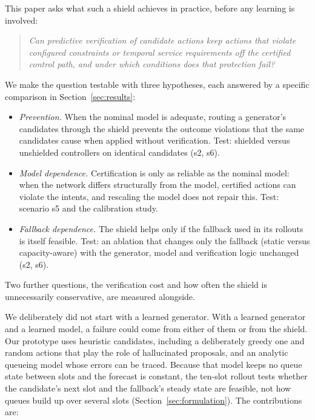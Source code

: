 \documentclass[conference]{IEEEtran}
\begin{document}
This paper asks what such a shield achieves in practice, before any learning is
involved:

\begin{quote}
\emph{Can predictive verification of candidate actions keep actions that violate
configured constraints or temporal service requirements off the certified control
path, and under which conditions does that protection fail?}
\end{quote}

\noindent We make the question testable with three hypotheses, each answered by a
specific comparison in Section~\ref{sec:results}:

\begin{itemize}
\item[\textbf{H1}] \emph{Prevention.} When the nominal model is adequate, routing
a generator's candidates through the shield prevents the outcome violations that
the same candidates cause when applied without verification. Test: shielded versus
unshielded controllers on identical candidates (s2, s6).
\item[\textbf{H2}] \emph{Model dependence.} Certification is only as reliable as the
nominal model: when the network differs structurally from the model, certified
actions can violate the intents, and rescaling the model does not repair this.
Test: scenario s5 and the calibration study.
\item[\textbf{H3}] \emph{Fallback dependence.} The shield helps only if the
fallback used in its rollouts is itself feasible. Test: an ablation that changes only
the fallback (static versus capacity-aware) with the generator, model and
verification logic unchanged (s2, s6).
\end{itemize}

\noindent Two further questions, the verification cost and how often the shield is
unnecessarily conservative, are measured alongside.

We deliberately did not start with a learned generator. With a learned generator
and a learned model, a failure could come from either of them or from the shield.
Our prototype uses heuristic candidates, including a deliberately greedy one and
random actions that play the role of hallucinated proposals, and an analytic
queueing model whose errors can be traced. Because that model keeps no queue state
between slots and the forecast is constant, the ten-slot rollout tests whether the
candidate's next slot and the fallback's steady state are feasible, not how queues
build up over several slots (Section~\ref{sec:formulation}). The contributions are:
\end{document}

